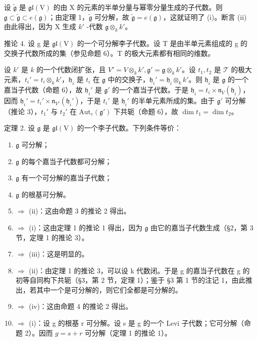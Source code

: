 设 \(\tilde{\mathfrak{g}}\) 是 \(\mathfrak{gl}(\mathrm{V})\) 的由 X 的元素的半单分量与幂零分量生成的子代数。则 \(\mathfrak{g} \subset \tilde{\mathfrak{g}} \subset e(\mathfrak{g})\)；由定理 1，\(\tilde{\mathfrak{g}}\) 可分解，故 \(\tilde{\mathfrak{g}} = e(\mathfrak{g})\)，这就证明了 (i)。断言 (ii) 由此得出，因为 X 生成 \(k'\) -代数 \(\mathfrak{g} \otimes_k k'\)。

推论 4. 设 g 是 \(\mathfrak{gl}(\mathrm{V})\) 的一个可分解李子代数。设 T 是由半单元素组成的 g 的交换子代数所成的集（参见命题 6）。T 的极大元素都有相同的维数。

设 \(k'\) 是 \(k\) 的一个代数闭扩张，且 \(V' = V \otimes_k k', \mathfrak{g}' = \mathfrak{g} \otimes_k k'\)。设 \(t_1, t_2\) 是 \(\mathcal{T}\) 的极大元素，\(t_i' = t_i \otimes_k k'\)，\(\mathfrak{h}_i\) 是 \(t_i\) 在 \(\mathfrak{g}\) 中的交换子，\(\mathfrak{h}_i' = \mathfrak{h}_i \otimes_k k'\)。则 \(\mathfrak{h}_i\) 是 \(\mathfrak{g}\) 的一个嘉当子代数（命题 6），故 \(\mathfrak{h}_i'\) 是 \(\mathfrak{g}'\) 的一个嘉当子代数。于是 \(\mathfrak{h}_i = t_i \times \mathfrak{n}_V(\mathfrak{h}_i)\)，因而 \(\mathfrak{h}_i' = t_i' \times \mathfrak{n}_{V'}(\mathfrak{h}_i')\)，于是 \(t_i'\) 是 \(\mathfrak{h}_i'\) 的半单元素所成的集。由于 \(\mathfrak{g}'\) 可分解（推论 3），\(t_1'\) 与 \(t_2'\) 在 \(\text{Aut}_e(\mathfrak{g}')\) 下共轭（命题 6），故 \(\dim t_1 = \dim t_2\)。

定理 2. 设 \(\mathfrak{g}\) 是 \(\mathfrak{gl}(\mathrm{V})\) 的一个李子代数。下列条件等价：

\begin{enumerate}
\def\labelenumi{(\roman{enumi})}
\item
  \(\mathfrak{g}\) 可分解；
\item
  \(\mathfrak{g}\) 的每个嘉当子代数都可分解；
\item
  \(\mathfrak{g}\) 有一个可分解的嘉当子代数；
\item
  \(\mathfrak{g}\) 的根基可分解。
\item
  \(\Longrightarrow\) (ii)：这由命题 3 的推论 2 得出。
\item
  \(\Longrightarrow\) (i)：这由定理 1 的推论 1 得出，因为 \(\mathfrak{g}\) 由它的嘉当子代数生成（§2，第 3 节，定理 1 的推论 3）。
\item
  \(\Longrightarrow\) (iii)：这是明显的。
\item
  \(\Longrightarrow\) (ii)：由定理 1 的推论 3，可以设 k 代数闭。于是 g 的嘉当子代数在 g 的初等自同构下共轭（§3，第 2 节，定理 1）；鉴于 §3 第 1 节的注记 1，由此推出，若其中一个是可分解的，则它们全都是可分解的。
\item
  \(\Longrightarrow\) (iv)：这由命题 4 的推论 2 得出。
\item
  \(\Longrightarrow\) (i)：设 g 的根基 r 可分解。设 s 是 g 的一个 Levi 子代数；它可分解（命题 2）。因而 \(g = s + r\) 可分解（定理 1 的推论 1）。
\end{enumerate}

